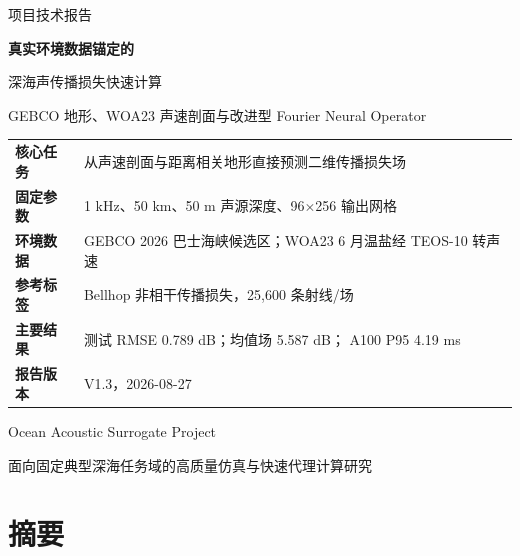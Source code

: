 \documentclass[UTF8,11pt]{ctexart}
\newcommand{\BestRMSE}{0.789}
\newcommand{\GlobalBaseline}{5.587}
\newcommand{\GpuPninetyfive}{4.19}
\begin{document}
\begin{titlepage}
\vspace*{2.0cm}
{\sffamily\color{Blue}\Large 项目技术报告}\par
\vspace{0.75cm}
{\sffamily\bfseries\color{Navy}\fontsize{26}{34}\selectfont
真实环境数据锚定的\par
深海声传播损失快速计算}\par
\vspace{0.65cm}
{\sffamily\color{Dark}\Large
GEBCO 地形、WOA23 声速剖面与改进型 Fourier Neural Operator}\par

\vspace{1.45cm}
\begin{summarybox}
\centering
\begin{tabular}{L{3.4cm}L{8.0cm}}
\textbf{核心任务} & 从声速剖面与距离相关地形直接预测二维传播损失场 \\
\textbf{固定参数} & 1 kHz、50 km、50 m 声源深度、96$\times$256 输出网格 \\
\textbf{环境数据} & GEBCO 2026 巴士海峡候选区；WOA23 6 月温盐经 TEOS-10 转声速 \\
\textbf{参考标签} & Bellhop 非相干传播损失，25,600 条射线/场 \\
\textbf{主要结果} & 测试 RMSE \BestRMSE{} dB；均值场 \GlobalBaseline{} dB；
  A100 P95 \GpuPninetyfive{} ms \\
\textbf{报告版本} & V1.3，2026-08-27 \\
\end{tabular}
\end{summarybox}
\vfill
{\sffamily\color{Navy}\Large Ocean Acoustic Surrogate Project}\par
\vspace{0.3cm}
{\color{Dark}面向固定典型深海任务域的高质量仿真与快速代理计算研究}\par
\vspace{1.0cm}
\end{titlepage}

\section*{摘\quad 要}
\end{document}
